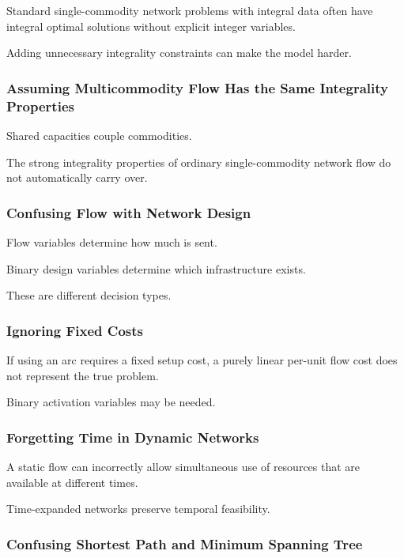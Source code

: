 Standard single-commodity network problems with integral data often have
integral optimal solutions without explicit integer variables.

Adding unnecessary integrality constraints can make the model harder.

\subsubsection{Assuming Multicommodity Flow Has the Same Integrality Properties}

Shared capacities couple commodities.

The strong integrality properties of ordinary single-commodity network
flow do not automatically carry over.

\subsubsection{Confusing Flow with Network Design}

Flow variables determine how much is sent.

Binary design variables determine which infrastructure exists.

These are different decision types.

\subsubsection{Ignoring Fixed Costs}

If using an arc requires a fixed setup cost, a purely linear per-unit flow
cost does not represent the true problem.

Binary activation variables may be needed.

\subsubsection{Forgetting Time in Dynamic Networks}

A static flow can incorrectly allow simultaneous use of resources that are
available at different times.

Time-expanded networks preserve temporal feasibility.

\subsubsection{Confusing Shortest Path and Minimum Spanning Tree}

